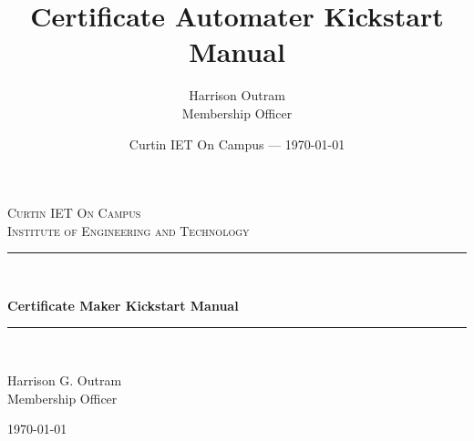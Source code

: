 \documentclass[11pt]{article}
\title{Certificate Automater Kickstart Manual} %
\author{Harrison Outram\\ Membership Officer}
\date{Curtin IET On Campus --- \today} %
\begin{document}

\begin{titlepage} %
    \newcommand{\HRule}{\rule{\linewidth}{0.5mm}} %
    
    \center %
    
    
    \textsc{\LARGE Curtin IET On Campus}\\[1.5cm] %
    
    \textsc{\LARGE Institute of Engineering and Technology}\\[0.5cm] %
    
    
    \HRule\\[0.4cm]

    \vspace{0.4cm}
    
    {\Huge\bfseries Certificate Maker Kickstart Manual}\\[0.4cm] %
    
    \HRule\\[1.5cm]
    
    
    \begin{center}
        \large
        Harrison G. Outram \\
        Membership Officer
    \end{center}
    
    
    \vfill\vfill\vfill %
    
    {\Large\today} %
    

\end{titlepage}
\end{document}
